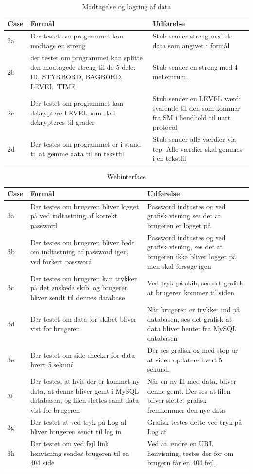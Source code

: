 \begin{table}[H]
\caption{Modtagelse og lagring af data}
\centering
\begin{tabular}{| p{1cm}  | p{4.5cm} | p{8cm} |}
\hline
Case &Formål &Udførelse\\\hline
2a &Der testet om programmet kan modtage en streng &Stub sender streng med de data som angivet i formål\\\hline
2b & der testet om programmet kan splitte den modtagede streng til de 5 dele: ID, STYRBORD, BAGBORD, LEVEL, TIME & Stub sender en streng med 4 mellemrum. \\\hline
2c &Der testet om programmet kan dekryptere LEVEL som skal dekrypteres til grader &Stub sender en LEVEL værdi svarende til den som kommer fra SM i hendhold til uart protocol\\\hline
2d &Der testes om programmet er i stand til at gemme data til en tekstfil &Stub sender alle værdier via tcp. Alle værdier skal gemmes i en tekstfil\\\hline
\end{tabular}
\end{table}
\begin{table}[H]
\caption{Webinterface}
\centering
\begin{tabular}{| p{1cm}  | p{4.5cm} | p{8cm} |}
\hline
Case &Formål &Udførelse\\\hline
3a &Der testes om brugeren bliver logget på ved indtastning af korrekt password&Password indtastes og ved grafisk visning ses det at brugeren er logget på\\\hline
3b &Der testes om brugeren bliver bedt om indtastning af password igen, ved forkert password&Password indtastes og ved grafisk visning, ses det at brugeren ikke bliver logget på, men skal forsøge igen\\\hline
3c &Der testes om brugeren kan trykker på det ønskede skib, og brugeren bliver sendt til dennes database& Ved tryk på skib, ses det grafisk at brugeren kommer til siden\\\hline
3d &Der testet om data for skibet bliver vist for brugeren& Når brugeren er trykket ind på databasen, ses det grafisk at data bliver hentet fra MySQL databasen\\\hline
3e &Der testet om side checker for data hvert 5 sekund& Der ses grafisk og med stop ur at siden opdatere hvert 5 sekund.\\\hline
3f &Der testes, at hvis der er kommet ny data, at denne bliver gemt i MySQL databasen, og filen slettes samt data vist for brugeren& Når en ny fil med data, bliver denne gemt. Der ses at filen bliver slettet grafisk fremkommer den nye data\\\hline
3g &Der testet at ved tryk på Log af bliver brugeren sendt til log in & Grafisk testes dette ved tryk på Log af\\\hline
3h &Der testet om ved fejl link henvisning sendes brugeren til en 404 side & Ved at ændre en URL henvisning, testes der for om brugern får en 404 fejl.\\\hline
\end{tabular}
\end{table}



